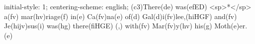 initial-style: 1;
centering-scheme: english;
(c3)There(de) was(efED) <sp>*</sp> a(fv) mar(hv)riage(f) in(e) Ca(fv)na(e) of(d) Gal(d)i(fv)lee,(hiHGF) and(fv) Je(hijv)sus(i) was(hg) there(fiHGE) (,) with(fv) Mar(fv)y(hv) his(g) Moth(e)er.(e)
